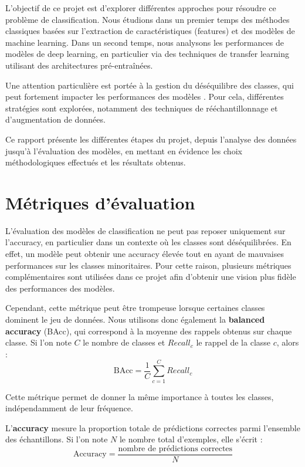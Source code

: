 \documentclass[journal,twocolumn]{IEEEtran}
\begin{document}
L’objectif de ce projet est d’explorer différentes approches pour résoudre ce problème de classification. Nous étudions dans un premier temps des méthodes classiques basées sur l’extraction de caractéristiques (features) et des modèles de machine learning. Dans un second temps, nous analysons les performances de modèles de deep learning, en particulier via des techniques de transfer learning utilisant des architectures pré-entraînées.

Une attention particulière est portée à la gestion du déséquilibre des classes, qui peut fortement impacter les performances des modèles \cite{Gao_2026}. Pour cela, différentes stratégies sont explorées, notamment des techniques de rééchantillonnage et d’augmentation de données.

Ce rapport présente les différentes étapes du projet, depuis l’analyse des données jusqu’à l’évaluation des modèles, en mettant en évidence les choix méthodologiques effectués et les résultats obtenus.


\section{Métriques d'évaluation}

L’évaluation des modèles de classification ne peut pas reposer uniquement sur l’accuracy, en particulier dans un contexte où les classes sont déséquilibrées. En effet, un modèle peut obtenir une accuracy élevée tout en ayant de mauvaises performances sur les classes minoritaires. Pour cette raison, plusieurs métriques complémentaires sont utilisées dans ce projet afin d’obtenir une vision plus fidèle des performances des modèles.

Cependant, cette métrique peut être trompeuse lorsque certaines classes dominent le jeu de données. Nous utilisons donc également la \textbf{balanced accuracy} (BAcc), qui correspond à la moyenne des rappels obtenus sur chaque classe. Si l’on note $C$ le nombre de classes et $Recall_c$ le rappel de la classe $c$, alors :
\begin{equation}
\mathrm{BAcc} = \frac{1}{C}\sum_{c=1}^{C} Recall_c
\end{equation}

Cette métrique permet de donner la même importance à toutes les classes, indépendamment de leur fréquence.

L’\textbf{accuracy} mesure la proportion totale de prédictions correctes parmi l’ensemble des échantillons. Si l’on note $N$ le nombre total d’exemples, elle s’écrit :
\begin{equation}
\mathrm{Accuracy} = \frac{\text{nombre de prédictions correctes}}{N}
\end{equation}
\end{document}
